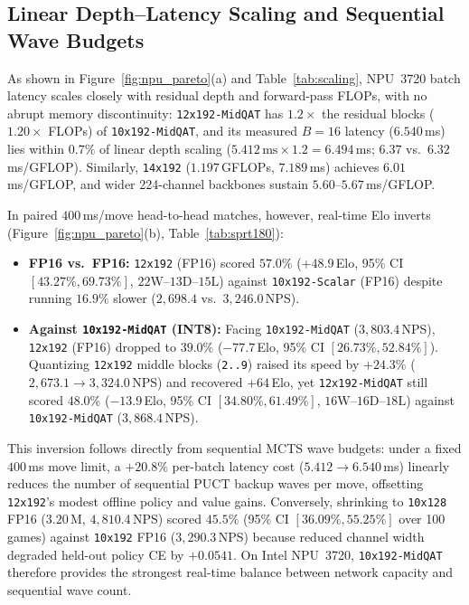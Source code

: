 \documentclass[10pt,twocolumn]{article}
\begin{document}
\subsection{Linear Depth--Latency Scaling and Sequential Wave Budgets}
As shown in Figure~\ref{fig:npu_pareto}(a) and Table~\ref{tab:scaling}, NPU~3720 batch latency scales closely with residual depth and forward-pass FLOPs, with no abrupt memory discontinuity: \texttt{12x192-MidQAT} has $1.2\times$ the residual blocks ($1.20\times$ FLOPs) of \texttt{10x192-MidQAT}, and its measured $B=16$ latency ($6.540$\,ms) lies within $0.7\%$ of linear depth scaling ($5.412\,\text{ms} \times 1.2 = 6.494$\,ms; $6.37$ vs.\ $6.32$\,ms/GFLOP). Similarly, \texttt{14x192} ($1.197$\,GFLOPs, $7.189$\,ms) achieves $6.01$\,ms/GFLOP, and wider 224-channel backbones sustain $5.60$--$5.67$\,ms/GFLOP.

In paired $400$\,ms/move head-to-head matches, however, real-time Elo inverts (Figure~\ref{fig:npu_pareto}(b), Table~\ref{tab:sprt180}):
\begin{itemize}
  \item \textbf{FP16 vs.\ FP16:} \texttt{12x192} (FP16) scored $57.0\%$ ($+48.9$\,Elo, 95\% CI $[43.27\%, 69.73\%]$, $22\text{W}\text{--}13\text{D}\text{--}15\text{L}$) against \texttt{10x192-Scalar} (FP16) despite running $16.9\%$ slower ($2{,}698.4$ vs.\ $3{,}246.0$\,NPS).
  \item \textbf{Against \texttt{10x192-MidQAT} (INT8):} Facing \texttt{10x192-MidQAT} ($3{,}803.4$\,NPS), \texttt{12x192} (FP16) dropped to $39.0\%$ ($-77.7$\,Elo, 95\% CI $[26.73\%, 52.84\%]$). Quantizing \texttt{12x192} middle blocks (\texttt{2..9}) raised its speed by $+24.3\%$ ($2{,}673.1 \to 3{,}324.0$\,NPS) and recovered $+64$\,Elo, yet \texttt{12x192-MidQAT} still scored $48.0\%$ ($-13.9$\,Elo, 95\% CI $[34.80\%, 61.49\%]$, $16\text{W}\text{--}16\text{D}\text{--}18\text{L}$) against \texttt{10x192-MidQAT} ($3{,}868.4$\,NPS).
\end{itemize}
This inversion follows directly from sequential MCTS wave budgets: under a fixed $400$\,ms move limit, a $+20.8\%$ per-batch latency cost ($5.412 \to 6.540$\,ms) linearly reduces the number of sequential PUCT backup waves per move, offsetting \texttt{12x192}'s modest offline policy and value gains. Conversely, shrinking to \texttt{10x128} FP16 ($3.20$\,M, $4{,}810.4$\,NPS) scored $45.5\%$ (95\% CI $[36.09\%, 55.25\%]$ over 100 games) against \texttt{10x192} FP16 ($3{,}290.3$\,NPS) because reduced channel width degraded held-out policy CE by $+0.0541$. On Intel NPU~3720, \texttt{10x192-MidQAT} therefore provides the strongest real-time balance between network capacity and sequential wave count.
\end{document}

